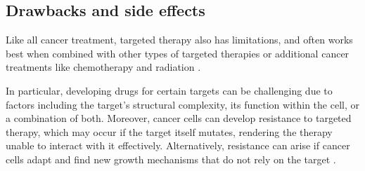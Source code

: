 \subsection{Drawbacks and side effects}

Like all cancer treatment, targeted therapy also has limitations, and often works best when combined with other types of targeted therapies or additional cancer treatments like chemotherapy and radiation \cite{target_therapy1}.

In particular, developing drugs for certain targets can be challenging due to factors including the target's structural complexity, its function within the cell, or a combination of both. Moreover, cancer cells can develop resistance to targeted therapy, which may occur if the target itself mutates, rendering the therapy unable to interact with it effectively. Alternatively, resistance can arise if cancer cells adapt and find new growth mechanisms that do not rely on the target \cite{target_therapy1}.


